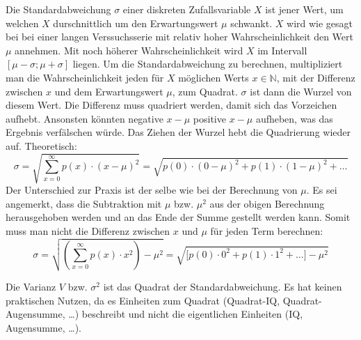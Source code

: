 Die Standardabweichung $\sigma$ einer diskreten Zufallsvariable $X$ ist jener Wert, um welchen $X$ durschnittlich um den Erwartungswert $\mu$ schwankt. $X$ wird wie gesagt bei bei einer langen Verssuchsserie mit relativ hoher Wahrscheinlichkeit den Wert $\mu$ annehmen. Mit noch h\"{o}herer Wahrscheinlichkeit wird $X$ im Intervall $[\mu - \sigma ; \mu + \sigma]$ liegen. Um die Standardabweichung zu berechnen, multipliziert man die Wahrscheinlichkeit jeden f\"{u}r $X$ m\"{o}glichen Werts $x \in \mathbb{N}$, mit der Differenz zwischen $x$ und dem Erwartungswert $\mu$, zum Quadrat. $\sigma$ ist dann die Wurzel von diesem Wert. Die Differenz muss quadriert werden, damit sich das Vorzeichen aufhebt. Ansonsten k\"{o}nnten negative $x - \mu$ positive $x - \mu$ aufheben, was das Ergebnis verf\"{a}lschen w\"{u}rde. Das Ziehen der Wurzel hebt die Quadrierung wieder auf. Theoretisch: $$\sigma = \sqrt{\sum_{x=0}^{\infty} p(x) \cdot (x - \mu)^2} = \sqrt{p(0) \cdot (0 - \mu)^2 + p(1) \cdot (1 - \mu)^2 + \dots}$$ Der Unterschied zur Praxis ist der selbe wie bei der Berechnung von $\mu$. Es sei angemerkt, dass die Subtraktion mit $\mu$ bzw. $\mu^2$ aus der obigen Berechnung herausgehoben werden und an das Ende der Summe gestellt werden kann. Somit muss man nicht die Differenz zwischen $x$ und $\mu$ f\"{u}r jeden Term berechnen: $$\sigma = \sqrt{\left( \sum_{x=0}^{\infty} p(x) \cdot x^2\right) - \mu^2} = \sqrt{\big[ p(0) \cdot 0^2 + p(1) \cdot 1^2 + \dots \big] - \mu^2}$$

Die Varianz $V$ bzw. $\sigma^2$ ist das Quadrat der Standardabweichung. Es hat keinen praktischen Nutzen, da es Einheiten zum Quadrat (Quadrat-IQ, Quadrat-Augensumme, \dots) beschreibt und nicht die eigentlichen Einheiten (IQ, Augensumme, \dots).



